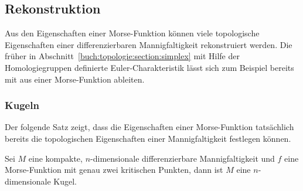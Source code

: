 %
%
\subsection{Rekonstruktion}
Aus den Eigenschaften einer Morse-Funktion können viele topologische
Eigenschaften einer differenzierbaren Mannigfaltigkeit rekonstruiert
werden.
Die früher in Abschnitt~\ref{buch:topologie:section:simplex}
mit Hilfe der Homologiegruppen definierte Euler-Charakteristik
lässt sich zum Beispiel bereits mit aus einer Morse-Funktion
ableiten.

%
%
\subsubsection{Kugeln}
Der folgende Satz zeigt, dass die Eigenschaften einer Morse-Funktion
tatsächlich bereits die topologischen Eigenschaften einer Mannigfaltigkeit
festlegen können.

\begin{satz}
\label{buch:topologie:morse:satz:kugeln}
Sei $M$ eine kompakte, $n$-dimensionale differenzierbare Mannigfaltigkeit
und $f$ eine Morse-Funktion mit genau zwei kritischen Punkten, dann ist
$M$ eine $n$-dimensionale Kugel.
\end{satz}

